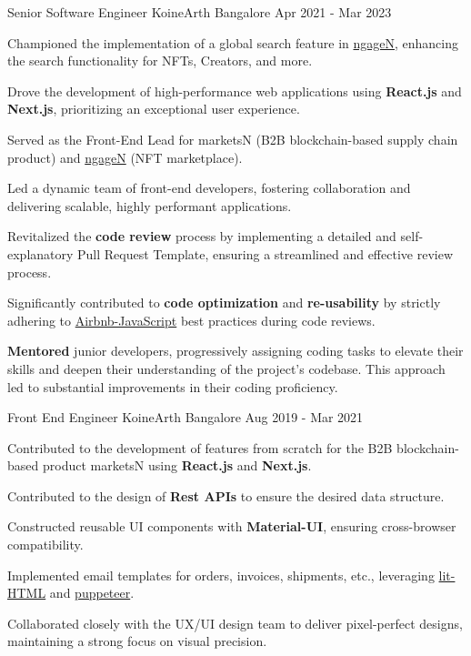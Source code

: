 \begin{cventries}
  \cventry
    {Senior Software Engineer}
    {KoineArth}
    {Bangalore}
    {Apr 2021 - Mar 2023}
    {
      \begin{cvitems}
        \item{Championed the implementation of a global search feature in \href{https://ngagen.com/}{ngageN}, enhancing the search functionality for NFTs, Creators, and more.}
        \item{Drove the development of high-performance web applications using \textbf{React.js} and \textbf{Next.js}, prioritizing an exceptional user experience.}
        \item{Served as the Front-End Lead for marketsN (B2B blockchain-based supply chain product) and \href{https://ngagen.com/}{ngageN} (NFT marketplace).}
        \item{Led a dynamic team of front-end developers, fostering collaboration and delivering scalable, highly performant applications.}
        \item{Revitalized the \textbf{code review} process by implementing a detailed and self-explanatory Pull Request Template, ensuring a streamlined and effective review process.}
        \item{Significantly contributed to \textbf{code optimization} and \textbf{re-usability} by strictly adhering to \href{https://github.com/airbnb/javascript}{Airbnb-JavaScript} best practices during code reviews.}
        \item{\textbf{Mentored} junior developers, progressively assigning coding tasks to elevate their skills and deepen their understanding of the project's codebase. This approach led to substantial improvements in their coding proficiency.}
      \end{cvitems}
    }

  \cventry
    {Front End Engineer}
    {KoineArth}
    {Bangalore}
    {Aug 2019 - Mar 2021}
    {
        \begin{cvitems}
            \item{Contributed to the development of features from scratch for the B2B blockchain-based product marketsN using \textbf{React.js} and \textbf{Next.js}.}
            \item{Contributed to the design of \textbf{Rest APIs} to ensure the desired data structure.}
            \item{Constructed reusable UI components with \textbf{Material-UI}, ensuring cross-browser compatibility.}
            \item{Implemented email templates for orders, invoices, shipments, etc., leveraging \href{https://lit.dev/docs/libraries/standalone-templates/}{lit-HTML} and \href{https://github.com/puppeteer/puppeteer}{puppeteer}.}
            \item{Collaborated closely with the UX/UI design team to deliver pixel-perfect designs, maintaining a strong focus on visual precision.}
        \end{cvitems}
    }


\end{cventries}
